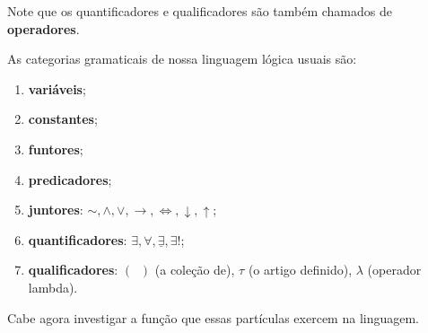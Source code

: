 Note que os quantificadores e qualificadores são também chamados de \textbf{operadores}.

As categorias gramaticais de nossa linguagem lógica usuais são:

\begin{enumerate}
    \item \textbf{variáveis};
    \item \textbf{constantes};
    \item \textbf{funtores};
    \item \textbf{predicadores};
    \item \textbf{juntores}: $\sim, \land, \lor, \to, \iff, \downarrow, \uparrow$;
    \item \textbf{quantificadores}: $\exists, \forall, \underline{\exists}, \exists!$;
    \item \textbf{qualificadores}: $(\;\;)$ (a coleção de), $\tau$ (o artigo definido), $\lambda$ (operador lambda).
\end{enumerate}

Cabe agora investigar a função que essas partículas exercem na linguagem.

